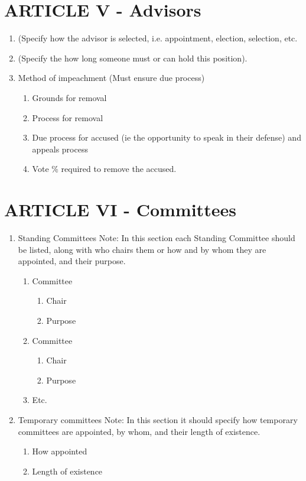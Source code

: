 \documentclass[11pt,a4paper,notitlepage]{article}
\begin{document}
\section*{ARTICLE V - Advisors}
\begin{enumerate}[label=\Alph*.]
  \item	(Specify how the advisor is selected, i.e. appointment, election,
  selection, etc.
  \item (Specify the how long someone must or can hold this position).
  \item Method of impeachment (Must ensure due process)
    \begin{enumerate}[label=\arabic*.]
      \item Grounds for removal
      \item Process for removal
      \item Due process for accused (ie the opportunity to speak in their
      defense) and appeals process
      \item Vote \% required to remove the accused.
    \end{enumerate}
\end{enumerate}


\section*{ARTICLE VI - Committees}
\begin{enumerate}[label=\Alph*.]
  \item Standing Committees Note:  In this section each Standing Committee
  should be listed, along with who chairs them or how and by whom they are
  appointed, and their purpose.
    \begin{enumerate}
      \item Committee
        \begin{enumerate}
          \item Chair
          \item Purpose
        \end{enumerate}
      \item Committee 
        \begin{enumerate}
          \item Chair
          \item Purpose
        \end{enumerate}
      \item Etc.
    \end{enumerate}
  \item Temporary committees Note:  In this section it should specify how
  temporary committees are appointed, by whom, and their length of existence.
    \begin{enumerate}
      \item How appointed
      \item Length of existence
    \end{enumerate}
\end{enumerate}
\end{document}

